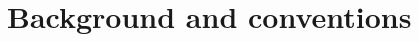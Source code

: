 \documentclass[Thesis.tex]{subfiles}
\begin{document}

\chapter{Background and conventions}




\end{document}
